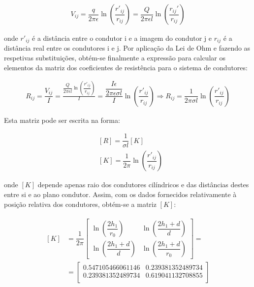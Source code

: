 \documentclass[portuguese, a4paper]{article}
\begin{document}
	\begin{align*}
		V_{ij} = \dfrac{q}{2\pi\epsilon} \ln\left(\dfrac{r'_{ij} }{r_{ij} }\right) = \dfrac{Q}{2\pi\epsilon l} \ln\left(\dfrac{r_{ij} '}{r_{ij} }\right)
	\end{align*}

	\par
	onde $r'_{ij}$ é a distância entre o condutor i e a imagem do condutor j e $r_{ij}$ é a distância real entre os condutores i e j. Por aplicação da Lei de Ohm e fazendo as respetivas substituições, obtém-se finalmente a expressão para calcular os elementos da matriz dos coeficientes de resistência para o sistema de condutores:

	\begin{align*}
		R_{ij} = \dfrac{V_{ij} }{I} = \frac{\dfrac{Q}{2\pi\epsilon l} \ln\left(\dfrac{r'_{ij} }{r_{ij} }\right)}{I}
		= \dfrac{\dfrac{I \epsilon}{2\pi\epsilon \sigma l}}{I} \ln\left(\dfrac{r'_{ij} }{r_{ij} }\right)
		\Rightarrow R_{ij} = \dfrac{1}{2\pi\sigma l}\ln\left(\dfrac{r'_{ij} }{r_{ij} }\right)
	\end{align*}

	\par
	Esta matriz pode ser escrita na forma:

	\begin{align*}
		&[R] = \dfrac{1}{\sigma l} [K]  \\
		&[K] = \dfrac{1}{2 \pi} \ln\left(\dfrac{r'_{ij} }{r_{ij} }\right)
	\end{align*}

	\par
	onde $[K]$ depende apenas raio dos condutores cilíndricos e das distâncias destes entre si e ao plano condutor. Assim, com os dados fornecidos relativamente à posição relativa dos condutores, obtém-se a matriz $[K]$:

	\begin{align*}
		\begin{split}
		[K] &= \dfrac{1}{2\pi}
		\begin{bmatrix}
			\ln\left(\dfrac{2h_1}{r_0}\right) & \ln\left(\dfrac{2h_1 + d}{d}\right)  \\[1em]
			\ln\left(\dfrac{2h_1 + d}{d}\right) & \ln\left(\dfrac{2h_1 + d}{r_0}\right)
		\end{bmatrix} = \\
		&= \begin{bmatrix}
			0.547105466061146 & 0.239381352489734 \\
			0.239381352489734 & 0.619041132708855 \\
		\end{bmatrix}
		\end{split}
		\end{align*}
\end{document}
